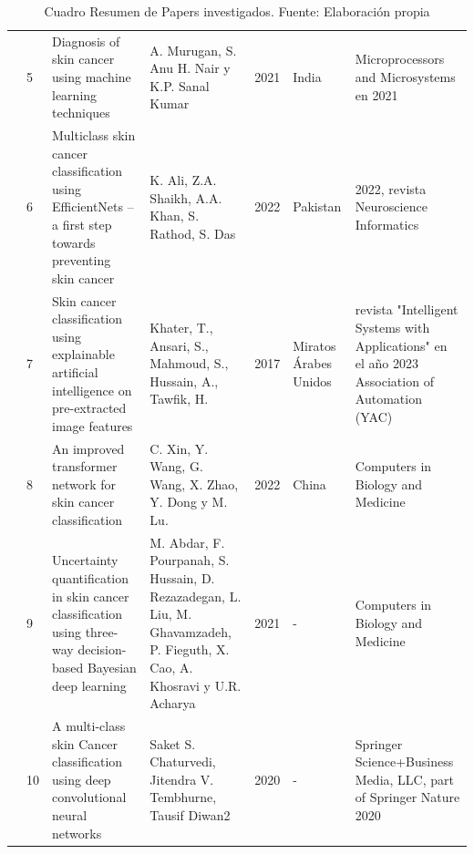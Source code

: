 \begin{table}[h]
\begin{tabular}{|m{0.5cm}|m{0.3cm}|m{4cm}|m{2cm}|m{0.6cm}|m{1.7cm}|m{3cm}|}
	     \hline
		\multirow{4}{*}[-28ex]{\rotcell{\rlap{Técnica}}}                                          
			& 5                                             & Diagnosis of skin cancer using machine learning techniques                                               &A. Murugan, S. Anu H. Nair y K.P. Sanal Kumar & 2021                                        & India                                          & Microprocessors and Microsystems en 2021             \\ 
		\cline{2-7}
		
		
		
		
		& 6                                             & Multiclass skin cancer classification using EfficientNets – a first step towards preventing skin cancer~                   & K. Ali, Z.A. Shaikh, A.A. Khan, S. Rathod, S. Das                                      & 2022                                        & Pakistan                                        & 2022, revista Neuroscience Informatics \\ 
		\cline{2-7}
		& 7                                             & Skin cancer classification using explainable artificial intelligence on pre-extracted image features & Khater, T., Ansari, S., Mahmoud, S., Hussain, A., Tawfik, H. & 2017 & Miratos Árabes Unidos          & revista "Intelligent Systems with Applications" en el año 2023
		Association of Automation (YAC)~              \\ 
		\cline{2-7}
		& 8                                             & An improved transformer network for skin cancer classification
		 &  C. Xin, Y. Wang, G. Wang, X. Zhao, Y. Dong y M. Lu.~             & 2022                                        & China                                          & Computers in Biology and Medicine              \\ 
		\cline{2-7}
		& 9                                             & Uncertainty quantification in skin cancer classification using three-way decision-based Bayesian deep learning                                                                      & M. Abdar, F. Pourpanah, S. Hussain, D. Rezazadegan, L. Liu, M. Ghavamzadeh, P. Fieguth, X. Cao, A. Khosravi y U.R. Acharya                                   & 2021                                        & -                                          & Computers in Biology and Medicine                          \\
		\cline{2-7}
		& 10                                             &A multi-class skin Cancer classification using deep convolutional neural networks    & Saket S. Chaturvedi, Jitendra V. Tembhurne, Tausif Diwan2 & 2020                               & -         & Springer Science+Business Media, LLC, part of Springer Nature 2020 \\
		\hline
	\end{tabular}
	\caption{Cuadro Resumen de Papers investigados. Fuente: Elaboración propia}
\label{A:table}
\end{table}




